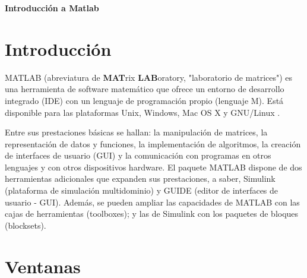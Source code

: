 \documentclass[11pt,legalpaper]{article}
\begin{document}

\centerline{\textbf{Introducci\'on  a Matlab}\circledR} 
%
\section{Introducci\'on}

MATLAB (abreviatura de \textbf{MAT}rix \textbf{LAB}oratory, "laboratorio de matrices") es una herramienta de 
software matem\'atico que ofrece un entorno de desarrollo integrado (IDE) con un lenguaje de programación propio 
(lenguaje M). Está disponible para las plataformas Unix, Windows, Mac OS X y GNU/Linux .

Entre sus prestaciones básicas se hallan: la manipulación de matrices, la representación de datos y funciones, 
la implementación de algoritmos, la creación de interfaces de usuario (GUI) y la comunicación con programas en 
otros lenguajes y con otros dispositivos hardware. El paquete MATLAB dispone de dos herramientas adicionales 
que expanden sus prestaciones, a saber, Simulink (plataforma de simulación multidominio) y GUIDE 
(editor de interfaces de usuario - GUI). Además, se pueden ampliar las capacidades de MATLAB con las cajas 
de herramientas (toolboxes); y las de Simulink con los paquetes de bloques (blocksets).
%
\section{Ventanas}
\end{document}
